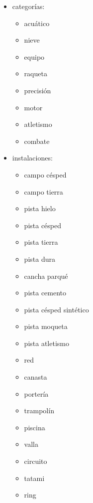 \begin{itemize}
\item categorías:
	\begin{itemize}
	\item acuático
	\item nieve
	\item equipo
	\item raqueta
	\item precisión
	\item motor
	\item atletismo
	\item combate
	\end{itemize}
	
\item instalaciones:
	\begin{itemize}
	\item campo césped
	\item campo tierra
	\item pista hielo
	\item pista césped
	\item pista tierra
	\item pista dura
	\item cancha parqué
	\item pista cemento
	\item pista césped sintético
	\item pista moqueta
	\item pista atletismo
	\item red
	\item canasta
	\item portería
	\item trampolín
	\item piscina
	\item valla
	\item circuito
	\item tatami
	\item ring
	\end{itemize}
	

\end{itemize}
